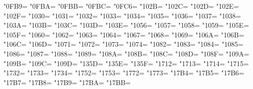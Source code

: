 \XeTeXcharclass"0FB9=\KclassCM
\XeTeXcharclass"0FBA=\KclassCM
\XeTeXcharclass"0FBB=\KclassCM
\XeTeXcharclass"0FBC=\KclassCM
\XeTeXcharclass"0FC6=\KclassCM
\XeTeXcharclass"102B=\KclassCM
\XeTeXcharclass"102C=\KclassCM
\XeTeXcharclass"102D=\KclassCM
\XeTeXcharclass"102E=\KclassCM
\XeTeXcharclass"102F=\KclassCM
\XeTeXcharclass"1030=\KclassCM
\XeTeXcharclass"1031=\KclassCM
\XeTeXcharclass"1032=\KclassCM
\XeTeXcharclass"1033=\KclassCM
\XeTeXcharclass"1034=\KclassCM
\XeTeXcharclass"1035=\KclassCM
\XeTeXcharclass"1036=\KclassCM
\XeTeXcharclass"1037=\KclassCM
\XeTeXcharclass"1038=\KclassCM
\XeTeXcharclass"103A=\KclassCM
\XeTeXcharclass"103B=\KclassCM
\XeTeXcharclass"103C=\KclassCM
\XeTeXcharclass"103D=\KclassCM
\XeTeXcharclass"103E=\KclassCM
\XeTeXcharclass"1056=\KclassCM
\XeTeXcharclass"1057=\KclassCM
\XeTeXcharclass"1058=\KclassCM
\XeTeXcharclass"1059=\KclassCM
\XeTeXcharclass"105E=\KclassCM
\XeTeXcharclass"105F=\KclassCM
\XeTeXcharclass"1060=\KclassCM
\XeTeXcharclass"1062=\KclassCM
\XeTeXcharclass"1063=\KclassCM
\XeTeXcharclass"1064=\KclassCM
\XeTeXcharclass"1067=\KclassCM
\XeTeXcharclass"1068=\KclassCM
\XeTeXcharclass"1069=\KclassCM
\XeTeXcharclass"106A=\KclassCM
\XeTeXcharclass"106B=\KclassCM
\XeTeXcharclass"106C=\KclassCM
\XeTeXcharclass"106D=\KclassCM
\XeTeXcharclass"1071=\KclassCM
\XeTeXcharclass"1072=\KclassCM
\XeTeXcharclass"1073=\KclassCM
\XeTeXcharclass"1074=\KclassCM
\XeTeXcharclass"1082=\KclassCM
\XeTeXcharclass"1083=\KclassCM
\XeTeXcharclass"1084=\KclassCM
\XeTeXcharclass"1085=\KclassCM
\XeTeXcharclass"1086=\KclassCM
\XeTeXcharclass"1087=\KclassCM
\XeTeXcharclass"1088=\KclassCM
\XeTeXcharclass"1089=\KclassCM
\XeTeXcharclass"108A=\KclassCM
\XeTeXcharclass"108B=\KclassCM
\XeTeXcharclass"108C=\KclassCM
\XeTeXcharclass"108D=\KclassCM
\XeTeXcharclass"108F=\KclassCM
\XeTeXcharclass"109A=\KclassCM
\XeTeXcharclass"109B=\KclassCM
\XeTeXcharclass"109C=\KclassCM
\XeTeXcharclass"109D=\KclassCM
\XeTeXcharclass"135D=\KclassCM
\XeTeXcharclass"135E=\KclassCM
\XeTeXcharclass"135F=\KclassCM
\XeTeXcharclass"1712=\KclassCM
\XeTeXcharclass"1713=\KclassCM
\XeTeXcharclass"1714=\KclassCM
\XeTeXcharclass"1715=\KclassCM
\XeTeXcharclass"1732=\KclassCM
\XeTeXcharclass"1733=\KclassCM
\XeTeXcharclass"1734=\KclassCM
\XeTeXcharclass"1752=\KclassCM
\XeTeXcharclass"1753=\KclassCM
\XeTeXcharclass"1772=\KclassCM
\XeTeXcharclass"1773=\KclassCM
\XeTeXcharclass"17B4=\KclassCM
\XeTeXcharclass"17B5=\KclassCM
\XeTeXcharclass"17B6=\KclassCM
\XeTeXcharclass"17B7=\KclassCM
\XeTeXcharclass"17B8=\KclassCM
\XeTeXcharclass"17B9=\KclassCM
\XeTeXcharclass"17BA=\KclassCM
\XeTeXcharclass"17BB=\KclassCM
